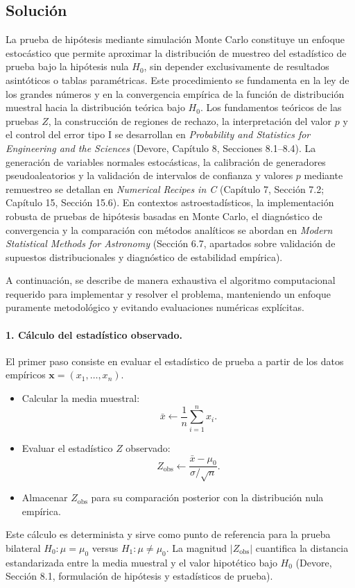 \documentclass[12pt]{article}
\begin{document}
\subsection{Solución}
La prueba de hipótesis mediante simulación Monte Carlo constituye un enfoque estocástico que permite aproximar la distribución de muestreo del estadístico de prueba bajo la hipótesis nula $H_0$, sin depender exclusivamente de resultados asintóticos o tablas paramétricas. Este procedimiento se fundamenta en la ley de los grandes números y en la convergencia empírica de la función de distribución muestral hacia la distribución teórica bajo $H_0$. Los fundamentos teóricos de las pruebas $Z$, la construcción de regiones de rechazo, la interpretación del valor $p$ y el control del error tipo I se desarrollan en \textit{Probability and Statistics for Engineering and the Sciences} (Devore, Capítulo 8, Secciones 8.1--8.4). La generación de variables normales estocásticas, la calibración de generadores pseudoaleatorios y la validación de intervalos de confianza y valores $p$ mediante remuestreo se detallan en \textit{Numerical Recipes in C} (Capítulo 7, Sección 7.2; Capítulo 15, Sección 15.6). En contextos astroestadísticos, la implementación robusta de pruebas de hipótesis basadas en Monte Carlo, el diagnóstico de convergencia y la comparación con métodos analíticos se abordan en \textit{Modern Statistical Methods for Astronomy} (Sección 6.7, apartados sobre validación de supuestos distribucionales y diagnóstico de estabilidad empírica).

A continuación, se describe de manera exhaustiva el algoritmo computacional requerido para implementar y resolver el problema, manteniendo un enfoque puramente metodológico y evitando evaluaciones numéricas explícitas.

\paragraph{1. Cálculo del estadístico observado.}
El primer paso consiste en evaluar el estadístico de prueba a partir de los datos empíricos $\mathbf{x} = (x_1, \dots, x_n)$.
\begin{itemize}
    \item Calcular la media muestral: $$\bar{x} \leftarrow \frac{1}{n} \sum_{i=1}^n x_i.$$
    \item Evaluar el estadístico $Z$ observado: $$Z_{\text{obs}} \leftarrow \frac{\bar{x} - \mu_0}{\sigma / \sqrt{n}}.$$
    \item Almacenar $Z_{\text{obs}}$ para su comparación posterior con la distribución nula empírica.
\end{itemize}
Este cálculo es determinista y sirve como punto de referencia para la prueba bilateral $H_0: \mu = \mu_0$ versus $H_1: \mu \neq \mu_0$. La magnitud $|Z_{\text{obs}}|$ cuantifica la distancia estandarizada entre la media muestral y el valor hipotético bajo $H_0$ (Devore, Sección 8.1, formulación de hipótesis y estadísticos de prueba).
\end{document}
